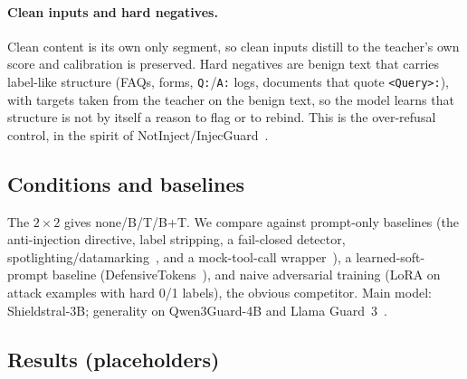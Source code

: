 \paragraph{Clean inputs and hard negatives.}
Clean content is its own only segment, so clean inputs distill to the teacher's own score and calibration is preserved.
Hard negatives are benign text that carries label-like structure (FAQs, forms, \texttt{Q:}/\texttt{A:} logs, documents that quote \texttt{<Query>:}), with targets taken from the teacher on the benign text, so the model learns that structure is not by itself a reason to flag or to rebind. %
This is the over-refusal control, in the spirit of NotInject/InjecGuard~\citep{li2024injecguard}.

\subsection{Conditions and baselines}

The $2{\times}2$ gives none/B/T/B+T.
We compare against prompt-only baselines (the anti-injection directive, label stripping, a fail-closed detector, spotlighting/datamarking~\citep{hines2024defending}, and a mock-tool-call wrapper~\citep{gros2026evaluating}), a learned-soft-prompt baseline (DefensiveTokens~\citep{chen2025defending}), and naive adversarial training (LoRA on attack examples with hard 0/1 labels), the obvious competitor.
Main model: Shieldstral-3B; generality on Qwen3Guard-4B and Llama Guard~3~\citep{zhao2025qwenguard,grattafiori2024llama}.

\subsection{Results (placeholders)}

